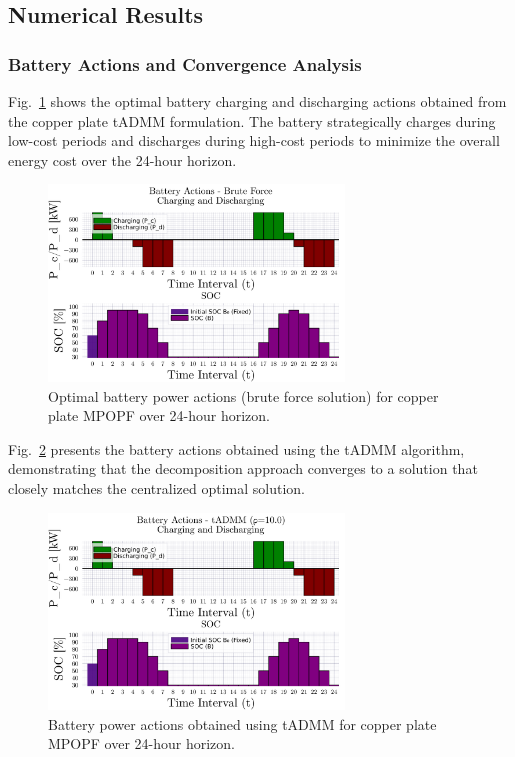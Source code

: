 \subsection{Numerical Results}

\subsubsection{Battery Actions and Convergence Analysis}

Fig.~\ref{fig:battery_actions_copper_plate} shows the optimal battery charging and discharging actions obtained from the copper plate tADMM formulation. The battery strategically charges during low-cost periods and discharges during high-cost periods to minimize the overall energy cost over the 24-hour horizon.

\begin{figure}[h]
    \centering
    \includegraphics[width=0.7\textwidth]{figures/battery-actions-copper-plate-T24-bf.png}
    \caption{Optimal battery power actions (brute force solution) for copper plate MPOPF over 24-hour horizon.}
    \label{fig:battery_actions_copper_plate}
\end{figure}

Fig.~\ref{fig:battery_actions_tadmm} presents the battery actions obtained using the tADMM algorithm, demonstrating that the decomposition approach converges to a solution that closely matches the centralized optimal solution.

\begin{figure}[h]
    \centering
    \includegraphics[width=0.7\textwidth]{figures/battery-actions-copper-plate-T24-tadmm.png}
    \caption{Battery power actions obtained using tADMM for copper plate MPOPF over 24-hour horizon.}
    \label{fig:battery_actions_tadmm}
\end{figure}

